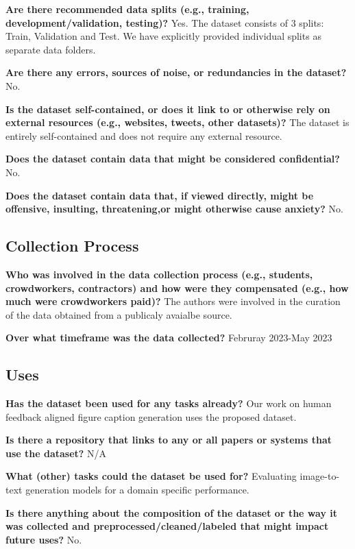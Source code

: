 \documentclass[11pt]{article}
\begin{document}
\textbf{Are there recommended data splits (e.g., training, development/validation, testing)?} Yes. The dataset consists of 3 splits: Train, Validation and Test. We have explicitly provided individual splits as separate data folders.

\textbf{Are there any errors, sources of noise, or redundancies in the dataset?} No.

\textbf{Is the dataset self-contained, or does it link to or otherwise rely on external resources (e.g., websites, tweets, other datasets)?} The dataset is entirely self-contained and does not require any external resource.

\textbf{Does the dataset contain data that might be considered confidential?} No.

\textbf{Does the dataset contain data that, if viewed directly, might be offensive, insulting, threatening,or might otherwise cause anxiety?} No.

\subsection{Collection Process}

\textbf{Who was involved in the data collection process (e.g., students, crowdworkers, contractors) and
how were they compensated (e.g., how much were crowdworkers paid)?} The authors were involved in the curation of the data obtained from a publicaly avaialbe source.

\textbf{Over what timeframe was the data collected?} Februray 2023-May 2023

\subsection{Uses}

\textbf{Has the dataset been used for any tasks already?} Our work on human feedback aligned figure caption generation uses the proposed dataset. 

\textbf{Is there a repository that links to any or all papers or systems that use the dataset?}  N/A

\textbf{What (other) tasks could the dataset be used for?} Evaluating image-to-text generation models for a domain specific performance. 

\textbf{Is there anything about the composition of the dataset or the way it was collected and
preprocessed/cleaned/labeled that might impact future uses?} No.
\end{document}
